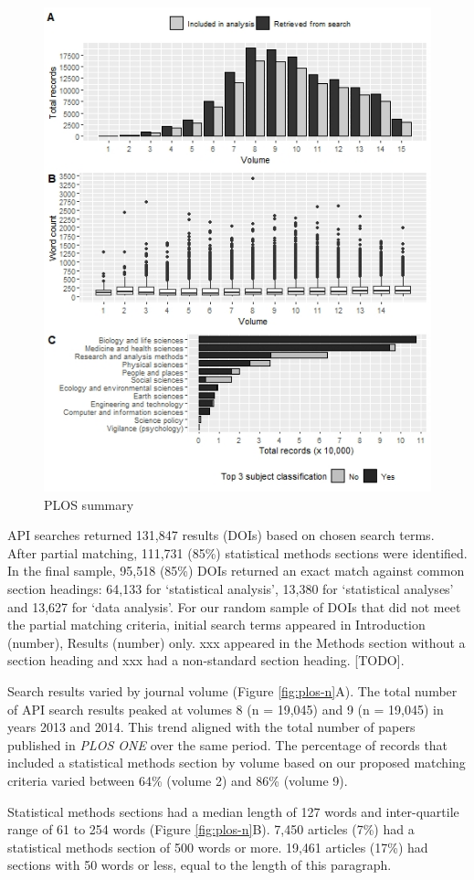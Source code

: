 \documentclass[12pt]{article}
\begin{document}
\begin{figure}

{\centering \includegraphics[width=0.6\linewidth]{figures/plos.summary} 

}

\caption{\label{fig:plos-n}PLOS summary}\label{fig:unnamed-chunk-3}
\end{figure}

API searches returned 131,847 results (DOIs) based on chosen search
terms. After partial matching, 111,731 (85\%) statistical methods
sections were identified. In the final sample, 95,518 (85\%) DOIs
returned an exact match against common section headings: 64,133 for
`statistical analysis', 13,380 for `statistical analyses' and 13,627 for
`data analysis'. For our random sample of DOIs that did not meet the
partial matching criteria, initial search terms appeared in Introduction
(number), Results (number) only. xxx appeared in the Methods section
without a section heading and xxx had a non-standard section heading.
{[}TODO{]}.

Search results varied by journal volume (Figure \ref{fig:plos-n}A). The
total number of API search results peaked at volumes 8 (n = 19,045) and
9 (n = 19,045) in years 2013 and 2014. This trend aligned with the total
number of papers published in \emph{PLOS ONE} over the same period. The
percentage of records that included a statistical methods section by
volume based on our proposed matching criteria varied between 64\%
(volume 2) and 86\% (volume 9).

Statistical methods sections had a median length of 127 words and
inter-quartile range of 61 to 254 words (Figure \ref{fig:plos-n}B).
7,450 articles (7\%) had a statistical methods section of 500 words or
more. 19,461 articles (17\%) had sections with 50 words or less, equal
to the length of this paragraph.
\end{document}
